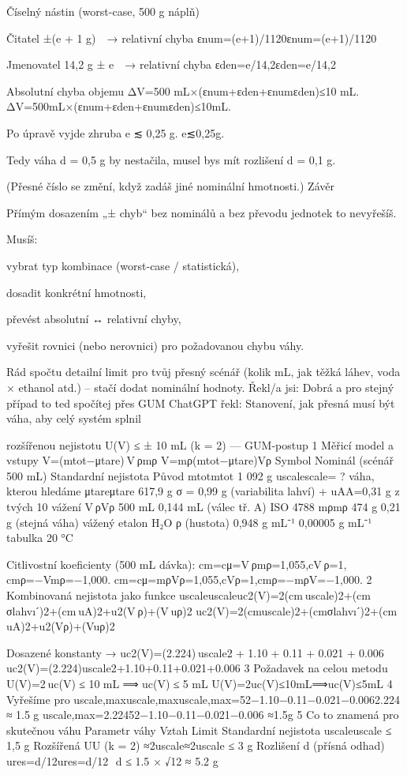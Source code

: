 {Číselný nástin (worst-case, 500 g náplň)

Čitatel ±(e + 1 g) → relativní chyba
εnum=(e+1)/1120εnum​=(e+1)/1120

Jmenovatel 14,2 g ± e → relativní chyba
εden=e/14,2εden​=e/14,2

Absolutní chyba objemu
ΔV=500  mL×(εnum+εden+εnumεden)≤10  mL.
ΔV=500mL×(εnum​+εden​+εnum​εden​)≤10mL.

Po úpravě vyjde zhruba
e  ≲  0,25  g.
e≲0,25g.

Tedy váha d = 0,5 g by nestačila, musel bys mít rozlišení d = 0,1 g.

(Přesné číslo se změní, když zadáš jiné nominální hmotnosti.)
Závěr

    Přímým dosazením „± chyb“ bez nominálů a bez převodu jednotek to nevyřešíš.

    Musíš:

        vybrat typ kombinace (worst-case / statistická),

        dosadit konkrétní hmotnosti,

        převést absolutní ↔ relativní chyby,

        vyřešit rovnici (nebo nerovnici) pro požadovanou chybu váhy.

Rád spočtu detailní limit pro tvůj přesný scénář (kolik mL, jak těžká láhev, voda × ethanol atd.) – stačí dodat nominální hodnoty.
Řekl/a jsi:
Dobrá a pro stejný případ to ted spočítej přes GUM
ChatGPT řekl:
Stanovení, jak přesná musí být váha, aby celý systém splnil

rozšířenou nejistotu U(V) ≤ ± 10 mL (k = 2) — GUM-postup
1 Měřicí model a vstupy
V=(mtot−μtare) V ⁣ρmρ
V=mρ​(mtot​−μtare​)Vρ​​
Symbol	Nominál (scénář 500 mL)	Standardní nejistota	Původ
mtotmtot​	1 092 g	uscalescale​ = ?	váha, kterou hledáme
μtareμtare​	617,9 g	σ = 0,99 g (variabilita lahví) + uAA​=0,31 g	z tvých 10 vážení
V ⁣ρVρ​	500 mL	0,144 mL (válec tř. A)	ISO 4788
mρmρ​	474 g	0,21 g (stejná váha)	vážený etalon H₂O
ρ (hustota)	0,948 g mL⁻¹	0,00005 g mL⁻¹	tabulka 20 °C

Citlivostní koeficienty (500 mL dávka):
cm=cμ=V ⁣ρmρ=1,055,cV ⁣ρ=1,  cmρ=−Vmρ=−1,000.
cm​=cμ​=mρ​Vρ​​=1,055,cVρ​​=1,cmρ​​=−mρ​V​=−1,000.
2 Kombinovaná nejistota jako funkce uscaleuscale​
uc2(V)=2(cm uscale)2+(cm σlahvıˊ)2+(cm uA)2+u2(V ⁣ρ)+(V uρ)2
uc2​(V)=2(cm​uscale​)2+(cm​σlahvıˊ​)2+(cm​uA​)2+u2(Vρ​)+(Vuρ​)2

Dosazené konstanty →
uc2(V)=(2.224) uscale2  +  1.10  +  0.11  +  0.021  +  0.006
uc2​(V)=(2.224)uscale2​+1.10+0.11+0.021+0.006
3 Požadavek na celou metodu
U(V)=2 uc(V)  ≤  10  mL  ⟹  uc(V)  ≤  5  mL
U(V)=2uc​(V)≤10mL⟹uc​(V)≤5mL
4 Vyřešíme pro uscale,maxuscale,max​
uscale,max=52−1.10−0.11−0.021−0.0062.224  ≈  1.5  g
uscale,max​=2.22452−1.10−0.11−0.021−0.006​
​≈1.5g
5 Co to znamená pro skutečnou váhu
Parametr váhy	Vztah	Limit
Standardní nejistota	uscaleuscale​	≤ 1,5 g
Rozšířená UU (k = 2)	≈2uscale≈2uscale​	≤ 3 g
Rozlišení d (přísná odhad)	ures=d/12ures​=d/12
​	d ≤ 1.5 × √12 ≈ 5.2 g

}
